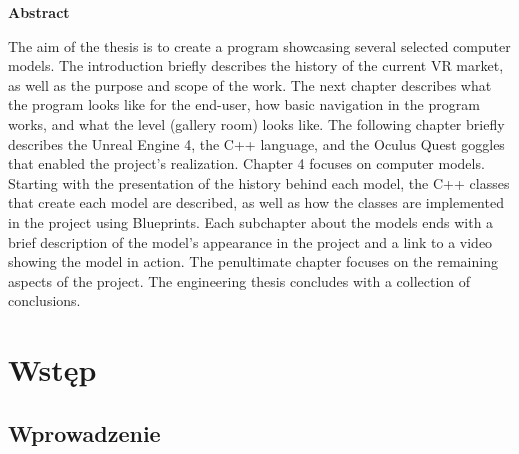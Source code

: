 \documentclass[a4paper,12pt,reqno]{article}
\begin{document}
\newpage
\begin{flushleft}
\Large \textbf{Abstract}
\end{flushleft}
\vspace{1cm}


The aim of the thesis is to create a program showcasing several selected computer models. The introduction briefly describes the history of the current VR market, as well as the purpose and scope of the work. The next chapter describes what the program looks like for the end-user, how basic navigation in the program works, and what the level (gallery room) looks like. The following chapter briefly describes the Unreal Engine 4, the C++ language, and the Oculus Quest goggles that enabled the project's realization. Chapter 4 focuses on computer models. Starting with the presentation of the history behind each model, the C++ classes that create each model are described, as well as how the classes are implemented in the project using Blueprints. Each subchapter about the models ends with a brief description of the model's appearance in the project and a link to a video showing the model in action. The penultimate chapter focuses on the remaining aspects of the project. The engineering thesis concludes with a collection of conclusions.

\newpage

\section{Wstęp}

\subsection{Wprowadzenie}
\end{document}
